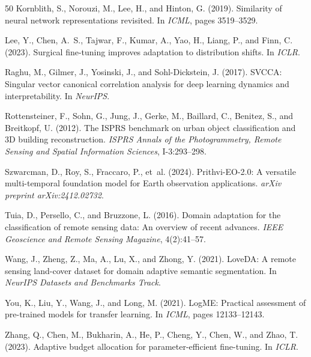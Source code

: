 \documentclass[11pt,a4paper]{report}
\begin{document}
\begin{thebibliography}{50}
Kornblith, S., Norouzi, M., Lee, H., and Hinton, G. (2019).
Similarity of neural network representations revisited.
In \emph{ICML}, pages 3519--3529.

Lee, Y., Chen, A.~S., Tajwar, F., Kumar, A., Yao, H., Liang, P., and Finn, C. (2023).
Surgical fine-tuning improves adaptation to distribution shifts.
In \emph{ICLR}.

Raghu, M., Gilmer, J., Yosinski, J., and Sohl-Dickstein, J. (2017).
SVCCA: Singular vector canonical correlation analysis for deep learning dynamics and interpretability.
In \emph{NeurIPS}.

Rottensteiner, F., Sohn, G., Jung, J., Gerke, M., Baillard, C., Benitez, S., and Breitkopf, U. (2012).
The ISPRS benchmark on urban object classification and 3D building reconstruction.
\emph{ISPRS Annals of the Photogrammetry, Remote Sensing and Spatial Information Sciences}, I-3:293--298.

Szwarcman, D., Roy, S., Fraccaro, P., et~al. (2024).
Prithvi-EO-2.0: A versatile multi-temporal foundation model for Earth observation applications.
\emph{arXiv preprint arXiv:2412.02732}.

Tuia, D., Persello, C., and Bruzzone, L. (2016).
Domain adaptation for the classification of remote sensing data: An overview of recent advances.
\emph{IEEE Geoscience and Remote Sensing Magazine}, 4(2):41--57.

Wang, J., Zheng, Z., Ma, A., Lu, X., and Zhong, Y. (2021).
LoveDA: A remote sensing land-cover dataset for domain adaptive semantic segmentation.
In \emph{NeurIPS Datasets and Benchmarks Track}.

You, K., Liu, Y., Wang, J., and Long, M. (2021).
LogME: Practical assessment of pre-trained models for transfer learning.
In \emph{ICML}, pages 12133--12143.

Zhang, Q., Chen, M., Bukharin, A., He, P., Cheng, Y., Chen, W., and Zhao, T. (2023).
Adaptive budget allocation for parameter-efficient fine-tuning.
In \emph{ICLR}.

\end{thebibliography}
\end{document}
